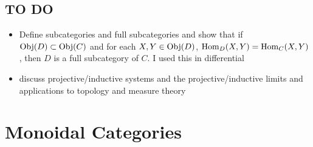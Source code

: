 \documentclass{book}
\begin{document}
	








































	

	\section{TO DO}
	\begin{itemize}
		\item Define subcategories and full subcategories and show that if $\operatorname{Obj}(D) \subset \operatorname{Obj}(C)$ and for each $X, Y \in \operatorname{Obj}(D)$, $\operatorname{Hom}_{D}(X, Y) = \operatorname{Hom}_{C}(X,Y)$, then $D$ is a full subcategory of $C$. I used this in differential 
		\item discuss projective/inductive systems and the projective/inductive limits and applications to topology and measure theory
	\end{itemize}
	
	
	
	
	
	
	
	
	
	
	
	
	

	
	
	
	
	
	
	
	
	
	
	
	
	
	
	
	
	\chapter{Monoidal Categories}
	
	\begin{defn}
		
	\end{defn}
	
\end{document}
